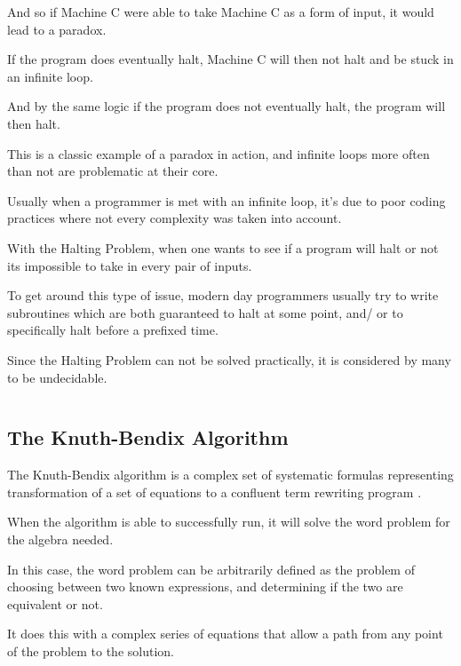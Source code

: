 \documentclass{article}
\begin{document}
\medskip\noindent
And so if Machine C were able to take Machine C as a form of input, it would lead to a paradox. 

\medskip\noindent
If the program does eventually halt, Machine C will then not halt and be stuck in an infinite loop. 

\medskip\noindent
And by the same logic if the program does not eventually halt, the program will then halt.

\medskip\noindent
This is a classic example of a paradox in action, and infinite loops more often than not are problematic at their core. 

\medskip\noindent
Usually when a programmer is met with an infinite loop, it's due to poor coding practices where not every complexity was taken into account.

\medskip\noindent
With the Halting Problem, when one wants to see if a program will halt or not its impossible to take in every pair of inputs.

\medskip\noindent
To get around this type of issue, modern day programmers usually try to write subroutines which are both guaranteed to halt at some point, and/ or to specifically halt before a prefixed time.

\medskip\noindent
Since the Halting Problem can not be solved practically, it is considered by many to be undecidable.

\medskip\medskip
\begin{lstlisting}
\end{lstlisting}

\medskip

\subsection{The Knuth-Bendix Algorithm}
\medskip\medskip
\hspace{\parindent} 

The Knuth-Bendix algorithm is a complex set of systematic formulas representing transformation of a set of equations to a confluent term rewriting program \cite{KB}. 

\medskip\noindent
When the algorithm is able to successfully run, it will solve the word problem for the algebra needed. 

\medskip\noindent
In this case, the word problem can be arbitrarily defined as the problem of choosing between two known expressions, and determining if the two are equivalent or not. 

\medskip\noindent
It does this with a complex series of equations that allow a path from any point of the problem to the solution.
\end{document}
